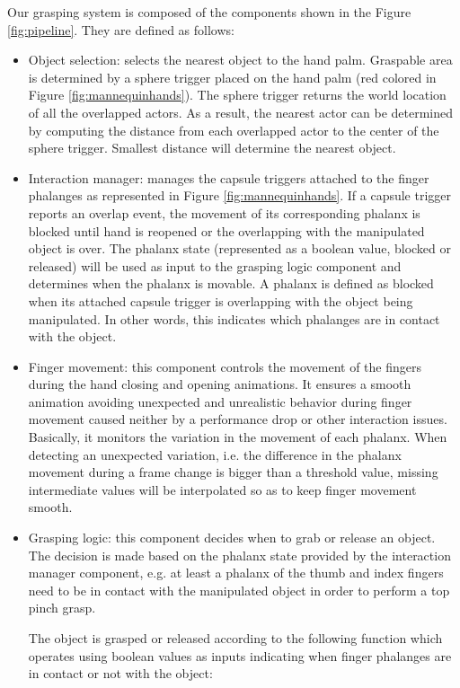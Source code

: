 Our grasping system is composed of the components shown in the Figure \ref{fig:pipeline}. They are defined as follows:
\begin{itemize}
	\item Object selection: selects the nearest object to the hand palm. Graspable area is determined by a sphere trigger placed on the hand palm (red colored in Figure \ref{fig:mannequinhands}). The sphere trigger returns the world location of all the overlapped actors. As a result, the nearest actor can be determined by computing the distance from each overlapped actor to the center of the sphere trigger. Smallest distance will determine the nearest object.
	\item Interaction manager: manages the capsule triggers attached to the finger phalanges as represented in Figure \ref{fig:mannequinhands}. If a capsule trigger reports an overlap event, the movement of its corresponding phalanx is blocked until hand is reopened or the overlapping with the manipulated object is over. The phalanx state (represented as a boolean value, blocked or released) will be used as input to the grasping logic component and determines when the phalanx is movable. A phalanx is defined as blocked when its attached capsule trigger is overlapping with the object being manipulated. In other words, this indicates which phalanges are in contact with the object.
	\item Finger movement: this component controls the movement of the fingers during the hand closing and opening animations. It ensures a smooth animation avoiding unexpected and unrealistic behavior during finger movement caused neither by a performance drop or other interaction issues. Basically, it monitors the variation in the movement of each phalanx. When detecting an unexpected variation, i.e. the difference in the phalanx movement during a frame change is bigger than a threshold value, missing intermediate values will be interpolated so as to keep finger movement smooth. 
	\item Grasping logic: this component decides when to grab or release an object. The decision is made based on the phalanx state provided by the interaction manager component, e.g. at least a phalanx of the thumb and index fingers need to be in contact with the manipulated object in order to perform a top pinch grasp. 
	
	The object is grasped or released according to the following function which operates using boolean values as inputs indicating when finger phalanges are in contact or not with the object:
	

\end{itemize}
